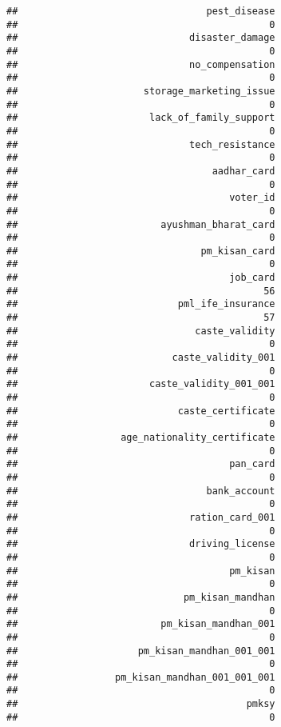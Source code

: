 \documentclass[
]{article}
\begin{document}
\begin{verbatim}
##                                 pest_disease 
##                                            0 
##                              disaster_damage 
##                                            0 
##                              no_compensation 
##                                            0 
##                      storage_marketing_issue 
##                                            0 
##                       lack_of_family_support 
##                                            0 
##                              tech_resistance 
##                                            0 
##                                  aadhar_card 
##                                            0 
##                                     voter_id 
##                                            0 
##                         ayushman_bharat_card 
##                                            0 
##                                pm_kisan_card 
##                                            0 
##                                     job_card 
##                                           56 
##                            pml_ife_insurance 
##                                           57 
##                               caste_validity 
##                                            0 
##                           caste_validity_001 
##                                            0 
##                       caste_validity_001_001 
##                                            0 
##                            caste_certificate 
##                                            0 
##                  age_nationality_certificate 
##                                            0 
##                                     pan_card 
##                                            0 
##                                 bank_account 
##                                            0 
##                              ration_card_001 
##                                            0 
##                              driving_license 
##                                            0 
##                                     pm_kisan 
##                                            0 
##                             pm_kisan_mandhan 
##                                            0 
##                         pm_kisan_mandhan_001 
##                                            0 
##                     pm_kisan_mandhan_001_001 
##                                            0 
##                 pm_kisan_mandhan_001_001_001 
##                                            0 
##                                        pmksy 
##                                            0 

\end{verbatim}
\end{document}
